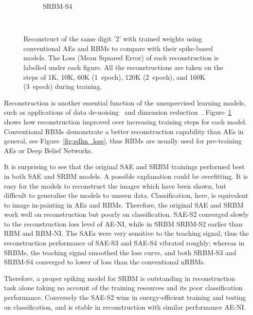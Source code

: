 \begin{figure}
\begin{subfigure}[t]{0.32\textwidth}
		\caption{SRBM-S4}
	\end{subfigure}\\
	\caption{Reconstruct of the same digit '2' with trained weights using \protect{} conventional AEs and RBMs to compare with their spike-based models.
		The Loss (Mean Squared Error) of each reconstruction is labelled under each figure.
		All the reconstructions are taken on the steps of 1K, 10K, 60K (1~epoch), 120K (2~epoch), and 160K (3~epoch) during training.}
	\label{fig:sdlm_recon}
\end{figure}

Reconstruction is another essential function of the unsupervised learning models, such as applications of data de-noising~\citep{xie2012image} and dimension reduction~\citep{hinton2006fast}.
Figure~\ref{fig:sdlm_recon} shows how reconstruction improved over increasing training steps for each model.
Conventional RBMs demonstrate a better reconstruction capability than AEs in general, see Figure~\ref{fig:sdlm_loss}, thus RBMs are usually used for pre-training \protect{} AEs or Deep Belief Networks.

It is surprising to see that the original SAE and SRBM trainings performed best in both SAE and SRBM models.
A possible explanation could be overfitting.
It is easy for the models to reconstruct the images which have been shown, but difficult to generalise the models to unseen data.
Classification, here, is equivalent to image in-painting in AEs and RBMs.
Therefore, the original SAE and SRBM work well on reconstruction but poorly on classification.
SAE-S2 converged slowly to the reconstruction loss level of AE-NI, while in SRBM \protect{} \protect{} SRBM-S2 \protect{} \protect{} earlier than RBM and RBM-NI.
The SAEs were very sensitive to the teaching signal, thus the reconstruction performance of SAE-S3 and SAE-S4 vibrated roughly; 
whereas in SRBMs, the teaching signal smoothed the loss curve, and both \protect{} SRBM-S3 and SRBM-S4 converged to lower \protect{} \protect{} of loss than the conventional nRBMs.

Therefore, \protect{} \protect{} a proper spiking model for \protect{} \protect{} SRBM is outstanding in \protect{} reconstruction task alone taking no account of the training resources and its poor classification performance.
Conversely the SAE-S2 wins in energy-efficient training and testing on classification, and is stable in reconstruction with similar performance \protect{} \protect{} AE-NI.



